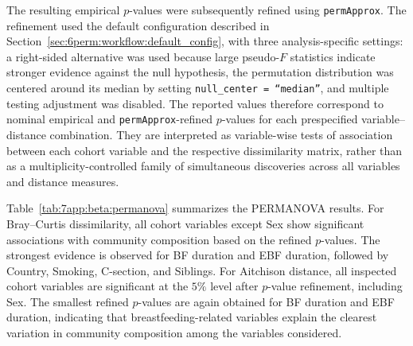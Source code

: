 The resulting empirical $p$-values were subsequently refined using \texttt{permApprox}. The refinement used the default configuration described in Section~\ref{sec:6perm:workflow:default_config}, with three analysis-specific settings: a right-sided alternative was used because large pseudo-$F$ statistics indicate stronger evidence against the null hypothesis, the permutation distribution was centered around its median by setting \texttt{null\_center = ``median''}, and multiple testing adjustment was disabled. The reported values therefore correspond to nominal empirical and \texttt{permApprox}-refined $p$-values for each prespecified variable--distance combination. They are interpreted as variable-wise tests of association between each cohort variable and the respective dissimilarity matrix, rather than as a multiplicity-controlled family of simultaneous discoveries across all variables and distance measures.

Table~\ref{tab:7app:beta:permanova} summarizes the PERMANOVA results. For Bray--Curtis dissimilarity, all cohort variables except Sex show significant associations with community composition based on the refined $p$-values. The strongest evidence is observed for BF duration and EBF duration, followed by Country, Smoking, C-section, and Siblings. For Aitchison distance, all inspected cohort variables are significant at the $5\%$ level after $p$-value refinement, including Sex. The smallest refined $p$-values are again obtained for BF duration and EBF duration, indicating that breastfeeding-related variables explain the clearest variation in community composition among the variables considered.

